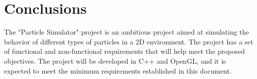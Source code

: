 \documentclass{article}
\begin{document}
\section{Conclusions}

The "Particle Simulator" project is an ambitious project aimed at simulating the behavior of different types of particles in a 2D environment. The project has a set of functional and non-functional requirements that will help meet the proposed objectives. The project will be developed in C++ and OpenGL, and it is expected to meet the minimum requirements established in this document.
\end{document}
